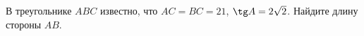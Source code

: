 \begin{ex}
	\begin{condition}
		В треугольнике \(ABC\) известно, что \(AC=BC=21\),  \( \tg A=2\sqrt{2} \). Найдите длину стороны \( AB \).
	\end{condition}
\end{ex}